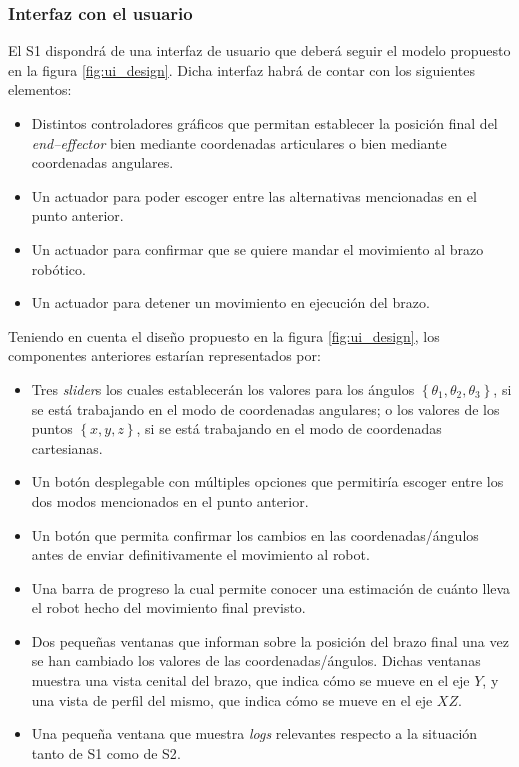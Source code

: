 \subsubsection{Interfaz con el usuario}
\label{sec:ui_reqs}
El \ac{S1} dispondrá de una interfaz de usuario que deberá seguir el modelo propuesto en la figura \ref{fig:ui_design}. Dicha interfaz habrá de contar con los siguientes elementos:
\begin{itemize}
    \item Distintos controladores gráficos que permitan establecer la posición final del \textit{end--effector} bien mediante coordenadas articulares o bien mediante coordenadas angulares.
    \item Un actuador para poder escoger entre las alternativas mencionadas en el punto anterior.
    \item Un actuador para confirmar que se quiere mandar el movimiento al brazo robótico.
    \item Un actuador para detener un movimiento en ejecución del brazo.
\end{itemize}

Teniendo en cuenta el diseño propuesto en la figura \ref{fig:ui_design}, los componentes anteriores estarían
representados por:

\begin{itemize}
    \item Tres \textit{slider}s los cuales establecerán los valores para los ángulos 
    $\left\{\theta_1, \theta_2, \theta_3\right\}$, si se está trabajando en el modo de coordenadas
    angulares; o los valores de los puntos $\left\{x, y, z\right\}$, si se está trabajando en el modo
    de coordenadas cartesianas.
    \item Un botón desplegable con múltiples opciones que permitiría escoger entre los dos modos
    mencionados en el punto anterior.
    \item Un botón que permita confirmar los cambios en las coordenadas/ángulos antes de enviar
    definitivamente el movimiento al robot.
    \item Una barra de progreso la cual permite conocer una estimación de cuánto lleva el robot hecho
    del movimiento final previsto.
    \item Dos pequeñas ventanas que informan sobre la posición del brazo final una vez se han
    cambiado los valores de las coordenadas/ángulos. Dichas ventanas muestra una vista cenital del
    brazo, que indica cómo se mueve en el eje $Y$, y una vista de perfil del mismo, que indica cómo
    se mueve en el eje $XZ$.
    \item Una pequeña ventana que muestra \textit{logs} relevantes respecto a la situación tanto
    de \ac{S1} como de \ac{S2}.
\end{itemize}